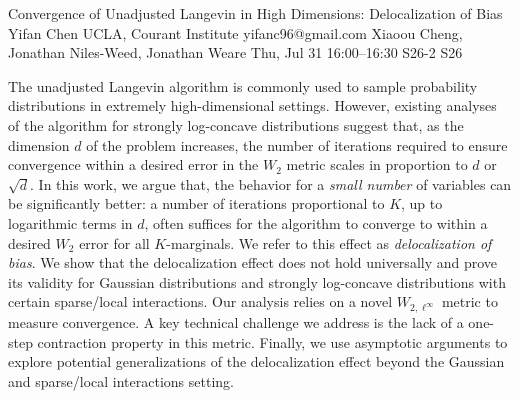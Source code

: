 \begin{talk}
\medskip


\end{talk}

\begin{talk}
  {Convergence of Unadjusted Langevin in High Dimensions: Delocalization of Bias}%
  {Yifan Chen}%
  {UCLA, Courant Institute}%
  {yifanc96@gmail.com}%
  {Xiaoou Cheng, Jonathan Niles-Weed, Jonathan Weare}%
  {}%
  {Thu, Jul 31 16:00–16:30}%
  {S26-2}%
  {S26}%
  
				
			
The unadjusted Langevin algorithm is commonly used to sample probability distributions in extremely high-dimensional settings. However, existing analyses of the algorithm for strongly log-concave distributions suggest that, as the dimension $d$ of the problem increases, the number of iterations required to ensure convergence within a desired error in the $W_2$ metric scales in proportion to $d$ or $\sqrt{d}$. In this work, we argue that, the behavior for a \emph{small number} of variables can be significantly better: a number of iterations proportional to $K$, up to logarithmic terms in $d$,
often suffices for the algorithm to converge to within a desired $W_2$ error for all $K$-marginals.
We refer to this effect as 
\textit{delocalization of bias}. 
We show that the delocalization effect does not hold universally and prove its validity for Gaussian distributions and strongly log-concave distributions with certain sparse/local interactions. Our analysis relies on a novel $W_{2,\ell^\infty}$ metric to measure convergence. A key technical challenge we address is the lack of a one-step contraction property in this metric. Finally, we use asymptotic arguments to explore potential generalizations of the delocalization effect beyond the Gaussian and sparse/local interactions setting.

\end{talk}

